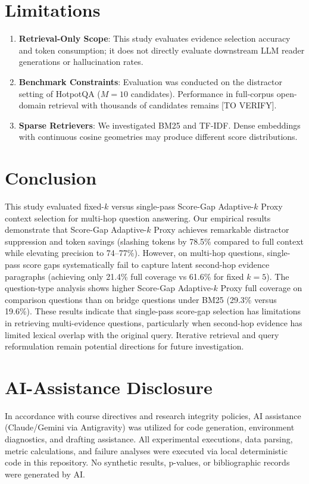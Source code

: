 \documentclass[conference]{IEEEtran}
\begin{document}
\section{Limitations}
\begin{enumerate}
    \item \textbf{Retrieval-Only Scope}: This study evaluates evidence selection accuracy and token consumption; it does not directly evaluate downstream LLM reader generations or hallucination rates.
    \item \textbf{Benchmark Constraints}: Evaluation was conducted on the distractor setting of HotpotQA ($M=10$ candidates). Performance in full-corpus open-domain retrieval with thousands of candidates remains [TO VERIFY].
    \item \textbf{Sparse Retrievers}: We investigated BM25 and TF-IDF. Dense embeddings with continuous cosine geometries may produce different score distributions.
\end{enumerate}

\section{Conclusion}
This study evaluated fixed-$k$ versus single-pass Score-Gap Adaptive-$k$ Proxy context selection for multi-hop question answering. Our empirical results demonstrate that Score-Gap Adaptive-$k$ Proxy achieves remarkable distractor suppression and token savings (slashing tokens by 78.5\% compared to full context while elevating precision to 74--77\%). However, on multi-hop questions, single-pass score gaps systematically fail to capture latent second-hop evidence paragraphs (achieving only 21.4\% full coverage vs 61.6\% for fixed $k=5$). The question-type analysis shows higher Score-Gap Adaptive-$k$ Proxy full coverage on comparison questions than on bridge questions under BM25 (29.3\% versus 19.6\%). These results indicate that single-pass score-gap selection has limitations in retrieving multi-evidence questions, particularly when second-hop evidence has limited lexical overlap with the original query. Iterative retrieval and query reformulation remain potential directions for future investigation.

\section*{AI-Assistance Disclosure}
In accordance with course directives and research integrity policies, AI assistance (Claude/Gemini via Antigravity) was utilized for code generation, environment diagnostics, and drafting assistance. All experimental executions, data parsing, metric calculations, and failure analyses were executed via local deterministic code in this repository. No synthetic results, p-values, or bibliographic records were generated by AI.



\end{document}
